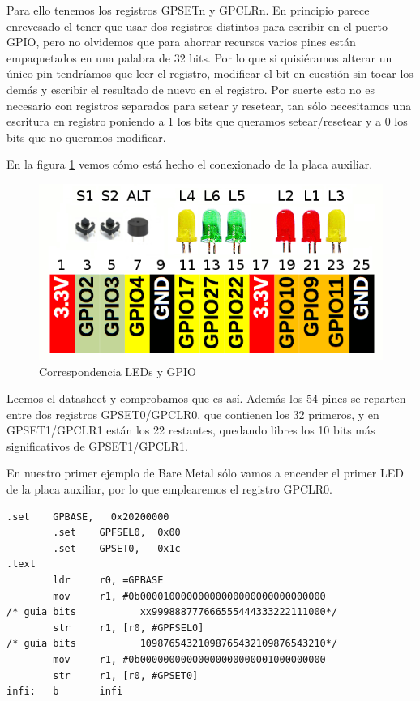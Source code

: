 Para ello tenemos los registros GPSETn y GPCLRn. En principio parece enrevesado el tener
que usar dos registros distintos para escribir en el puerto GPIO, pero no olvidemos que
para ahorrar recursos varios pines están empaquetados en una palabra de 32 bits. Por lo
que si quisiéramos alterar un único pin tendríamos que leer el registro, modificar el bit
en cuestión sin tocar los demás y escribir el resultado de nuevo en el registro. Por suerte
esto no es necesario con registros separados para setear y resetear, tan sólo necesitamos
una escritura en registro poniendo a 1 los bits que queramos setear/resetear y a 0 los bits
que no queramos modificar.

En la figura \ref{fig:pinout} vemos cómo está hecho el conexionado de la placa auxiliar.

\begin{figure}[h]
  \centering
    \includegraphics[width=14cm]{graphs/RaspberryGPIOaux.png}
  \caption{Correspondencia LEDs y GPIO}
  \label{fig:pinout}
\end{figure}

Leemos el datasheet y comprobamos que es así. Además los 54 pines se reparten entre dos
registros GPSET0/GPCLR0, que contienen los 32 primeros, y en GPSET1/GPCLR1 están los 22
restantes, quedando libres los 10 bits más significativos de GPSET1/GPCLR1.

En nuestro
primer ejemplo de Bare Metal sólo vamos a encender el primer LED de la placa auxiliar,
por lo que emplearemos el registro GPCLR0.

\begin{lstlisting}[caption={esbn2.s},label={lst:codigoPract4_2}]
        .set    GPBASE,   0x20200000
        .set    GPFSEL0,  0x00
        .set    GPSET0,   0x1c
.text
        ldr     r0, =GPBASE
        mov     r1, #0b00001000000000000000000000000000
/* guia bits           xx999888777666555444333222111000*/
        str     r1, [r0, #GPFSEL0]
/* guia bits           10987654321098765432109876543210*/
        mov     r1, #0b00000000000000000000001000000000
        str     r1, [r0, #GPSET0]
infi:   b       infi
\end{lstlisting}

